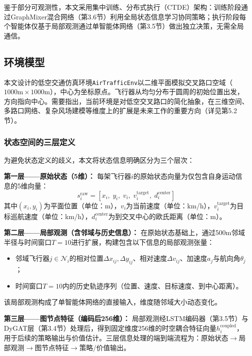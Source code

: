 \documentclass[12pt,a4paper,UTF8]{ctexart}
\begin{document}
鉴于部分可观测性，本文采用集中训练、分布式执行（CTDE）架构：训练阶段通过GraphMixer混合网络（第3.6节）利用全局状态信息学习协同策略；执行阶段每个智能体仅基于局部观测通过单智能体网络（第3.5节）做出独立决策，无需全局通信。

\subsection{环境模型}

本文设计的低空交通仿真环境\texttt{AirTrafficEnv}以二维平面模拟交叉路口空域（$1000\text{m} \times 1000\text{m}$），中心为坐标原点。飞行器从均匀分布于圆周的初始位置出发，方向指向中心。需要指出，当前环境是对低空交叉路口的简化抽象，在三维空间、多路口网络、复杂风场建模等维度上的扩展是未来工作的重要方向（详见第5.2节）。

\subsubsection{状态空间的三层定义}

为避免状态定义的歧义，本文将状态信息明确区分为三个层次：

\textbf{第一层——原始状态（5维）：}
每架飞行器$i$的原始状态向量为仅包含自身运动信息的5维向量：
\begin{equation}
    s_i^{\text{raw}} = [x_i,\; y_i,\; v_i,\; v_i^{\text{target}},\; d_i^{\text{center}}]
    \label{eq:raw_state}
\end{equation}
其中$(x_i, y_i)$为平面位置（单位：m），$v_i$为当前速度（单位：km/h），$v_i^{\text{target}}$为目标巡航速度（单位：km/h），$d_i^{\text{center}}$为到交叉中心的欧氏距离（单位：m）。

\textbf{第二层——局部观测（含邻域与历史信息）：}
在原始状态基础上，通过500m邻域半径与时间窗口$T=10$进行扩展，构建包含以下信息的局部观测张量：
\begin{itemize}
    \item 邻域飞行器$j \in \mathcal{N}_i$的相对位置$\Delta x_{ij}, \Delta y_{ij}$、相对速度$\Delta v_{ij}$、加速度$a_j$与航向角$\theta_j$；
    \item 时间窗口$T=10$内的历史轨迹序列（位置、速度、目标速度、到中心距离）。
\end{itemize}
该局部观测构成了单智能体网络的直接输入，维度随邻域大小动态变化。

\textbf{第三层——图节点特征（编码后256维）：}
局部观测经LSTM编码器（第3.5节）与DyGAT层（第3.4节）处理后，得到固定维度256维的时空耦合特征向量$h_i^{\text{coupled}}$，用于后续的策略输出与价值估计。三层信息处理的端到端流程为：原始状态$\to$局部观测$\to$图节点特征$\to$策略/价值输出。
\end{document}
